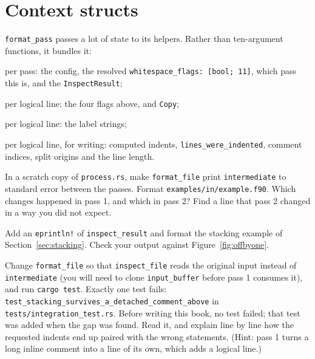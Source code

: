 \documentclass[11pt,a4paper,openany]{book}
\newcommand{\code}[1]{\texttt{\small #1}}
\newcommand{\file}[1]{\texttt{\small\color{accent}#1}}
\newcounter{exercise}[chapter]
\begin{document}
\section{Context structs}

\code{format\_pass} passes a lot of state to its helpers. Rather than ten-argument
functions, it bundles it:

\begin{description}[font=\ttfamily\small]
  \item[PassContext] per pass: the config, the resolved
    \code{whitespace\_flags: [bool; 11]}, which pass this is, and the
    \code{InspectResult};
  \item[FormattingFlags] per logical line: the four flags above, and
    \code{Copy};
  \item[LineLabels] per logical line: the label strings;
  \item[LineWriteContext] per logical line, for writing: computed indents,
    \code{lines\_were\_indented}, comment indices, split origins and the line
    length.
\end{description}

\begin{exercise}
In a scratch copy of \file{process.rs}, make \code{format\_file} print
\code{intermediate} to standard error between the passes. Format
\file{examples/in/example.f90}. Which changes happened in pass 1, and which in
pass 2? Find a line that pass 2 changed in a way you did not expect.
\end{exercise}

\begin{exercise}
Add an \code{eprintln!} of \code{inspect\_result} and format the stacking example
of Section~\ref{sec:stacking}. Check your output against
Figure~\ref{fig:offbyone}.
\end{exercise}

\begin{exercise}
Change \code{format\_file} so that \code{inspect\_file} reads the original input
instead of \code{intermediate} (you will need to clone \code{input\_buffer}
before pass 1 consumes it), and run \code{cargo test}. Exactly one test
fails: \code{test\_stacking\_survives\_a\_detached\_comment\_above} in
\file{tests/integration\_test.rs}. Before writing this book, no test failed;
that test was added when the gap was found. Read it, and explain line by line
how the requested indents end up paired with the wrong statements. (Hint: pass
1 turns a long inline comment into a line of its own, which adds a logical
line.)
\end{exercise}
\end{document}
